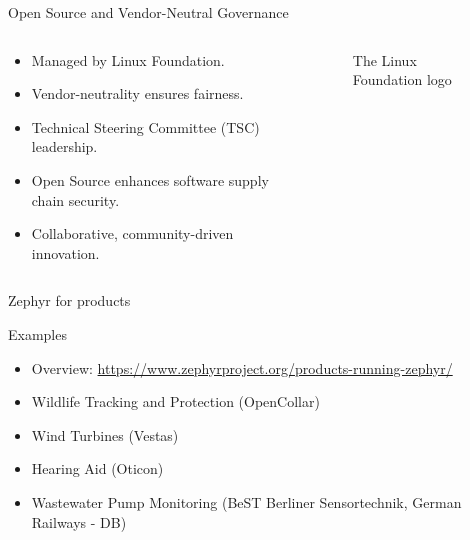 \documentclass[10pt, aspectratio=169]{beamer}
\begin{document}
\begin{frame}[fragile]{Open Source and Vendor-Neutral Governance}
  \begin{columns}
    \begin{column}{0.6\textwidth}
      \begin{itemize}
        \item Managed by Linux Foundation.
        \item Vendor-neutrality ensures fairness.
        \item Technical Steering Committee (TSC) leadership.
        \item Open Source enhances software supply chain security.
        \item Collaborative, community-driven innovation.
      \end{itemize}
    \end{column}
    \begin{column}{0.4\textwidth}
      \begin{figure}
        
        \caption*{The Linux Foundation logo}
      \end{figure}
    \end{column}
  \end{columns}
\end{frame}
\begin{frame}[fragile]{Zephyr for products}

  \begin{block}{Examples}
    \begin{itemize}
       \item Overview: {\scriptsize \url{https://www.zephyrproject.org/products-running-zephyr/}}
       \item Wildlife Tracking and Protection (OpenCollar)
       \item Wind Turbines (Vestas)
       \item Hearing Aid (Oticon)
       \item Wastewater Pump Monitoring (BeST Berliner Sensortechnik, German Railways - DB)
    \end{itemize}

  \end{block}
\end{frame}
\end{document}
